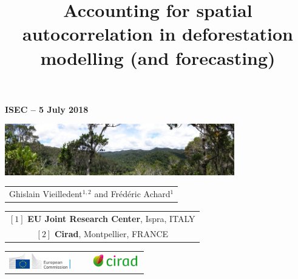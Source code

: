 \documentclass[slidetop,10pt,dvipsnames,leqno,fleqn]{beamer} %
\title[Modelling deforestation]{Accounting for spatial autocorrelation in deforestation modelling (and forecasting)}
\date{}
\begin{document}
{

  \begin{frame}[plain]
    \begin{center}
      \small{\textbf{ISEC -- 5 July 2018}}
    \end{center}
    \vspace{-0.5cm}
    \titlepage %
    \vspace{-2.5cm}
    \begin{center}
      \includegraphics[width=10cm]{./Figures/Banniere.png}
    \end{center}
    \begin{center}

      {\footnotesize
        \begin{tabular}{c}
          Ghislain Vieilledent$^{1,2}$ and Frédéric Achard$^{1}$ \\
        \end{tabular}
      }

      \vspace{0.25cm}

      {\scriptsize
        \begin{tabular}{c}
          $[1]$ \textbf{EU Joint Research Center}, Ispra, ITALY\\
          $[2]$ \textbf{Cirad}, Montpellier, FRANCE \\
        \end{tabular}
      }

      \vspace{0.25cm}

      \begin{tabular}{C{2cm}C{1cm}C{2cm}}
        \includegraphics[height=0.7cm]{./Figures/Logo-JRC.jpg} &
        ~ &
        \includegraphics[height=0.7cm]{./Figures/Logo-Cirad.png}\\
      \end{tabular}

    \end{center}
    
  \end{frame}

}
\end{document}
